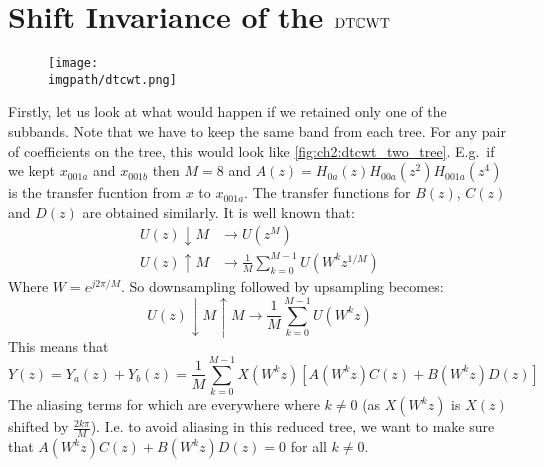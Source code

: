 \chapter{Shift Invariance of the $\mathrm{DT}\mathbb{C}\mathrm{WT}$}
\begin{figure}
  \texttt{[image: \\imgpath/dtcwt.png]}
\end{figure}
\begin{figure}
  \centering
  
  \label{fig:ch2:dtcwt_two_tree}
\end{figure}
Firstly, let us look at what would happen if we retained only one of the subbands.
Note that we have to keep the same band from each tree. For any pair of
coefficients on the tree, this would look like \autoref{fig:ch2:dtcwt_two_tree}.
E.g.\ if we kept $x_{001a}$ and $x_{001b}$ then $M=8$ and $A(z) =
H_{0a}(z)H_{00a}(z^2)H_{001a}(z^4)$ is the transfer fucntion from $x$ to
$x_{001a}$. The transfer functions for $B(z)$, $C(z)$ and $D(z)$ are obtained
similarly. It is well known that:
\begin{align}
  U(z) \downarrow M &\rightarrow  U(z^M) \\
  U(z) \uparrow M &\rightarrow  \frac{1}{M}\sum_{k=0}^{M-1}U(W^kz^{1/M})
\end{align}
Where $W=e^{j2\pi/M}$. So downsampling followed by upsampling becomes:
\begin{equation}
U(z) \downarrow M \uparrow M \rightarrow \frac{1}{M}\sum_{k=0}^{M-1}U(W^kz)
\end{equation}
This means that
%
\begin{equation}
  Y(z) = Y_{a}(z) + Y_{b}(z) = \frac{1}{M} \sum_{k=0}^{M-1} X(W^k z) [A(W^kz)C(z) + B(W^kz)D(z)]
\end{equation}
%
The aliasing terms for which are everywhere where $k \neq 0$ (as $X(W^kz)$ is
$X(z)$ shifted by $\frac{2k\pi}{M}$). I.e. to avoid aliasing in this reduced
tree, we want to make sure that $A(W^kz)C(z) + B(W^kz)D(z) = 0$ for all $k \neq
0$.

